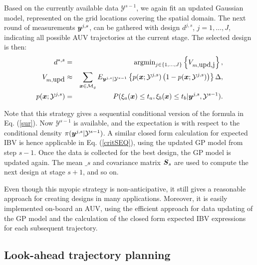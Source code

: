 \documentclass[aoas]{imsart}
\begin{document}
Based on the currently available data $\mathcal{Y}^{s-1}$, we again
fit an updated Gaussian model, represented on the grid locations
covering the spatial domain.  The next round of measurements
${\boldsymbol y}^{j,s}$, can be gathered with design $d^{j,s}$, $j=1,\ldots,J$,
indicating all possible AUV trajectories at the current stage. The
selected design is then:
\begin{eqnarray}\label{critSEQ}
    d^{*,s} &=& \mbox{argmin}_{j \in \{1,\ldots,J\}} \left\{ V_{m,\mbox{upd,j}} \right\},  \\
V_{m,\mbox{upd}} & \approx & \sum_{\bx \in \mathcal{M}_g} E_{\by^{j,s}|\mathcal{Y}^{s-1}} \left\{ p(\bx;\mathcal{Y}^{j,s})\left( 1-p(\bx;\mathcal{Y}^{j,s})\right) \right\} \Delta, \nonumber \\
    p(\bx;\mathcal{Y}^{j,s}) &=& P(\xi_a(\bx) \leq t_a, \xi_b(\bx) \leq t_b |\by^{j,s},\mathcal{Y}^{s-1}). \nonumber
\end{eqnarray}

Note that this strategy gives a sequential conditional version of the
formula in Eq. (\ref{sur}). Now $\mathcal{Y}^{s-1}$ is available, and
the expectation is with respect to the conditional density
$\pi({\boldsymbol y}^{j,s}|\mathcal{Y}^{s-1})$. A similar closed form calculation
for expected IBV is hence applicable in Eq. (\ref{critSEQ}), using the
updated GP model from step $s-1$.  Once the data is collected for the
best design, the GP model is updated again. The mean $\bm_{s}$ and
covariance matrix ${\boldsymbol S}_{s}$ are used to compute the next design at
stage $s+1$, and so on.

Even though this myopic strategy is non-anticipative, it still gives a
reasonable approach for creating designs in many
applications. Moreover, it is easily implemented on-board an AUV,
using the efficient approach for data updating of the GP model and the
calculation of the closed form expected IBV expressions for each
subsequent trajectory.


\subsection{Look-ahead trajectory planning}
\label{LA}
\end{document}
